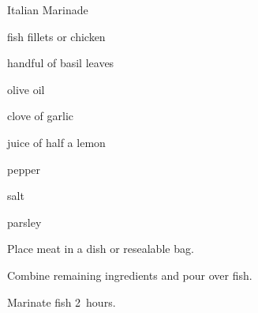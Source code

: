 \begin{recipe}{Italian Marinade}{}{}

\begin{ingredients}
\item fish fillets or chicken
\item handful of basil leaves
\item {} olive oil
\item clove of garlic
\item juice of half a lemon
\item pepper
\item salt
\item parsley
\end{ingredients}

\begin{directions}
\item Place meat in a dish or resealable bag.
\item Combine remaining ingredients and pour over fish.
\item Marinate fish 2~hours.
\end{directions}

\end{recipe}
